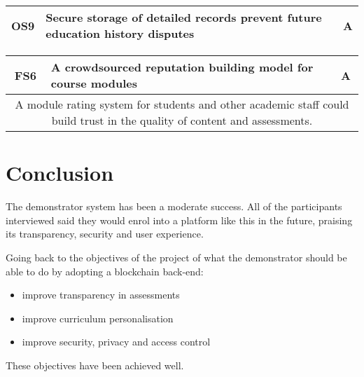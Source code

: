 \begin{table}[!ht]
	\begin{tabularx}{\textwidth}{|c|X|c|}
		\hline
		OS9 & \textbf{Secure storage of detailed records prevent future education history disputes} & A                 \\
		\hline
	\end{tabularx}
\end{table}

\begin{table}[!ht]
	\begin{tabularx}{\textwidth}{|c|X|c|}
		\hline
		FS6 & \textbf{A crowdsourced reputation building model for course modules} & A  \\
		\hline
		\multicolumn{3}{|X|}{
			A module rating system for students and other academic staff could build trust
			in the quality of content and assessments.
		} \\
		\hline
	\end{tabularx}
\end{table}

\section{Conclusion}

The demonstrator system has been a moderate success.
All of the participants interviewed said they would enrol into a platform like this in the future, 
praising its transparency, security and user experience.

Going back to the objectives of the project of what the demonstrator should be able to do by adopting a blockchain back-end:

\begin{itemize}
	\item improve transparency in assessments 
	\item improve curriculum personalisation
	\item improve security, privacy and access control
\end{itemize}

These objectives have been achieved well.

